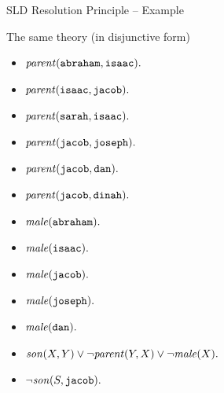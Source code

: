 \documentclass[presentation]{beamer}\mode<presentation>{\usetheme{AMSBolognaFC}}
\begin{document}
\begin{frame}[allowframebreaks]{SLD Resolution Principle -- Example}
    \begin{alertblock}{The same theory (in disjunctive form)}
        \begin{multicols}{2}
            \begin{itemize}
                \item $\text{\textit{parent}}(\mathtt{abraham}, \mathtt{isaac}) \mathtt{.}$
                \item $\text{\textit{parent}}(\mathtt{isaac}, \mathtt{jacob}) \mathtt{.}$
                \item $\text{\textit{parent}}(\mathtt{sarah}, \mathtt{isaac}) \mathtt{.}$
                \item $\text{\textit{parent}}(\mathtt{jacob}, \mathtt{joseph}) \mathtt{.}$
                \item $\text{\textit{parent}}(\mathtt{jacob}, \mathtt{dan}) \mathtt{.}$
                \item $\text{\textit{parent}}(\mathtt{jacob}, \mathtt{dinah}) \mathtt{.}$
                \item $\text{\textit{male}}(\mathtt{abraham}) \mathtt{.}$
                \item $\text{\textit{male}}(\mathtt{isaac}) \mathtt{.}$
                \item $\text{\textit{male}}(\mathtt{jacob}) \mathtt{.}$
                \item $\text{\textit{male}}(\mathtt{joseph}) \mathtt{.}$
                \item $\text{\textit{male}}(\mathtt{dan}) \mathtt{.}$
            \end{itemize}
        \end{multicols}
        \begin{itemize}
            \item $\text{\textit{son}}(X, Y) \vee \neg\text{\textit{parent}}(Y, X) \vee \neg\text{\textit{male}}(X) \mathtt{.}$
            \item $\neg\text{\textit{son}}(S, \mathtt{jacob}) \mathtt{.}$
        \end{itemize}
    \end{alertblock}


\end{frame}
\end{document}
